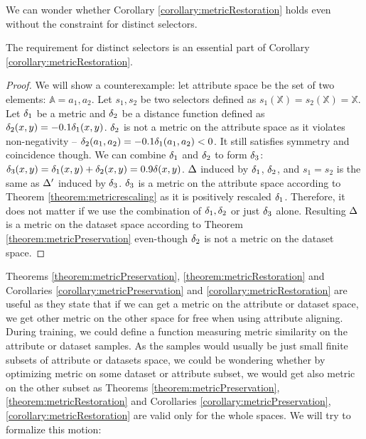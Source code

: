 We can wonder whether Corollary \ref{corollary:metricRestoration} holds even without the constraint for distinct selectors. 
\begin{observation}
The requirement for distinct selectors is an essential part of Corollary \ref{corollary:metricRestoration}. 
\begin{proof}
	We will show a counterexample: let attribute space be the set of two elements: $\mathbb{A}={a_1, a_2}$.
	Let $s_1,s_2$ be two selectors defined as $s_1(\mathbb{X})=s_2(\mathbb{X})=\mathbb{X}$. Let $\delta_1$ be a metric and $\delta_2$ be a distance function defined as $\delta_2(x,y)=-0.1\delta_1(x,y)$. $\delta_2$ is not a metric on the attribute space as it violates non-negativity -- $\delta_2(a_1, a_2) = -0.1\delta_1(a_1, a_2) < 0$. It still satisfies symmetry and coincidence though. We can combine $\delta_1$ and $\delta_2$ to form $\delta_3$: $\delta_3(x,y) = \delta_1(x,y)+\delta_2(x,y)=0.9\delta(x,y)$. $\Delta$ induced by $\delta_1$, $\delta_2$, and $s_1 = s_2$ is the same as $\Delta'$ induced by $\delta_3$. $\delta_3$ is a metric on the attribute space according to Theorem \ref{theorem:metricrescaling} as it is positively rescaled $\delta_1$. Therefore, it does not matter if we use the combination of $\delta_1,\delta_2$ or just $\delta_3$ alone. Resulting $\Delta$ is a metric on the dataset space according to Theorem \ref{theorem:metricPreservation} even-though $\delta_2$ is not a metric on the dataset space.
\end{proof}
\end{observation}

Theorems \ref{theorem:metricPreservation}, \ref{theorem:metricRestoration} and Corollaries \ref{corollary:metricPreservation} and  \ref{corollary:metricRestoration} are useful as they state that if we can get a metric on the attribute or dataset space, we get other metric on the other space for free when using attribute aligning. During training, we could define a function measuring metric similarity on the attribute or dataset samples. As the samples would usually be just small finite subsets of attribute or datasets space, we could be wondering whether by optimizing metric on some dataset or attribute subset, we would get also metric on the other subset as Theorems \ref{theorem:metricPreservation}, \ref{theorem:metricRestoration} and Corollaries \ref{corollary:metricPreservation}, \ref{corollary:metricRestoration} are valid only for the whole spaces. We will try to formalize this motion:

